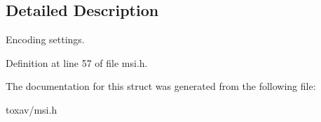\subsection{Detailed Description}
Encoding settings. 

Definition at line 57 of file msi.\+h.



The documentation for this struct was generated from the following file\+:\begin{DoxyCompactItemize}
\item 
toxav/msi.\+h\end{DoxyCompactItemize}
